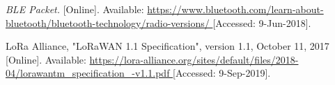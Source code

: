 \begin{thebibliography}{9}




\textit{
BLE Packet.
}
[Online]. Available:
\url{
https://www.bluetooth.com/learn-about-bluetooth/bluetooth-technology/radio-versions/
}
[Accessed: 9-Jun-2018].






LoRa Alliance, "LoRaWAN 1.1 Specification", version 1.1, October 11, 2017
[Online]. Available:
\url{
https://lora-alliance.org/sites/default/files/2018-04/lorawantm_specification_-v1.1.pdf
}
[Accessed: 9-Sep-2019].







\end{thebibliography}
